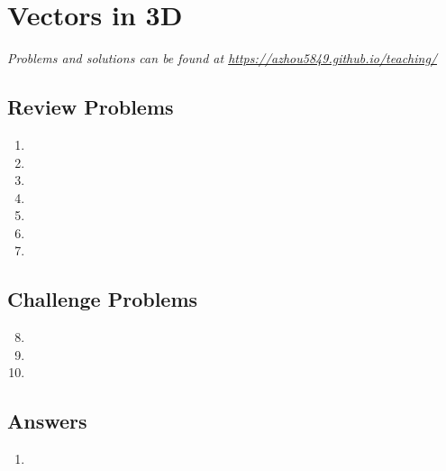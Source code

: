 \section{Vectors in 3D}

\emph{Problems and solutions can be found at \url{https://azhou5849.github.io/teaching/}}

\subsection{Review Problems}

\begin{enumerate}
\item %
\item %
\item %
\item %
\item %
\item %
\item %
\end{enumerate}


\newpage
\subsection{Challenge Problems}

\begin{enumerate}\setcounter{enumi}{7}
\item %
\item %
\item %
\end{enumerate}


\newpage
\subsection{Answers}

\begin{enumerate}
\item 
\end{enumerate}